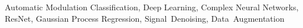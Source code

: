 \documentclass[conference]{IEEEtran}
\begin{document}
\begin{IEEEkeywords}
Automatic Modulation Classification, Deep Learning, Complex Neural Networks, ResNet, Gaussian Process Regression, Signal~Denoising, Data~Augmentation
\end{IEEEkeywords}




\end{document}
